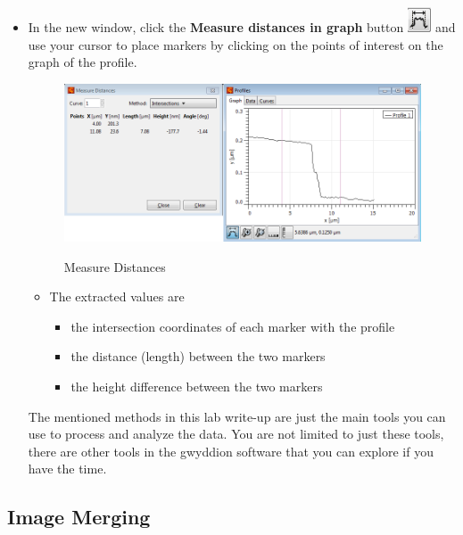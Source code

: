 \documentclass{../lab}
\begin{document}
\begin{itemize}
    \item In the new window, click the \textbf{Measure distances in graph} button \includegraphics[height=2em]{images/50.png} and use your cursor to place markers by clicking on the points of interest on the graph of the profile.
    
    \begin{figure}[H]
        \centering
        \href{http://experimentationlab.berkeley.edu/sites/default/files/AFMImages/51.png}{\includegraphics[width=0.65\linewidth]{images/51.png}}
        \caption{Measure Distances}
    \end{figure}
    
    \begin{itemize}
        \item The extracted values are
        \begin{itemize}
            \item the intersection coordinates of each marker with the profile
            \item the distance (length) between the two markers
            \item the height difference between the two markers
        \end{itemize}
    \end{itemize}
    
    The mentioned methods in this lab write-up are just the main tools you can use to process and analyze the data.  You are not limited to just these tools, there are other tools in the gwyddion software that you can explore if you have the time.
\end{itemize}

\subsection{Image Merging}
\label{subsec:ImageMerging}
\end{document}
